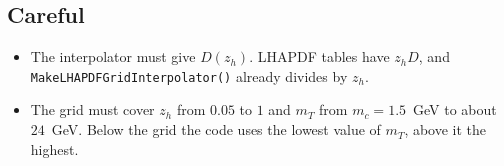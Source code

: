 \documentclass{article}
\begin{document}
\subsection*{Careful}

\begin{itemize}
\item The interpolator must give $D(z_h)$. LHAPDF tables have $z_h D$, and
  \texttt{MakeLHAPDFGridInterpolator()} already divides by $z_h$.
\item The grid must cover $z_h$ from $0.05$ to $1$ and $m_T$ from
  $m_c = 1.5$~GeV to about $24$~GeV. Below the grid the code uses the lowest
  value of $m_T$, above it the highest.
\end{itemize}
\end{document}
